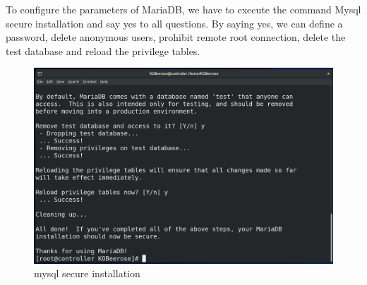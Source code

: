 \begin{spacing}{1.2}
\par 
To configure the parameters of MariaDB, we have to execute the command
Mysql secure installation and say yes to all questions. By saying yes, we can define a
password, delete anonymous users, prohibit remote root connection, delete
the test database and reload the privilege tables. 
\\
\begin{figure}[!htb] 
\begin{center} 
\includegraphics[width=1\linewidth]{Cloud/Config/mysql secure installation} 
\end{center} 
\caption{mysql secure installation} 
\end{figure}  \FloatBarrier
\\


\end{spacing}